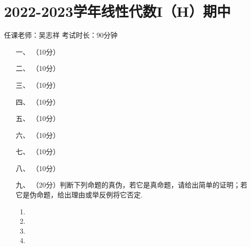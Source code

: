 \section*{2022-2023学年线性代数I（H）期中}

\begin{center}
    任课老师：吴志祥\hspace{4em} 考试时长：90分钟
\end{center}

\begin{enumerate}
	\item[一、]（10分）
	\item[二、]（10分）
	\item[三、]（10分）
	\item[四、]（10分）
	\item[五、]（10分）
	\item[六、]（10分）
	\item[七、]（10分）
    \item[八、]（10分）
	\item[九、]（20分）判断下列命题的真伪，若它是真命题，请给出简单的证明；若它是伪命题，给出理由或举反例将它否定.
    \begin{enumerate}[label=(\arabic*)]
        \item
        \item
        \item
        \item
    \end{enumerate}
\end{enumerate}

\newpage
